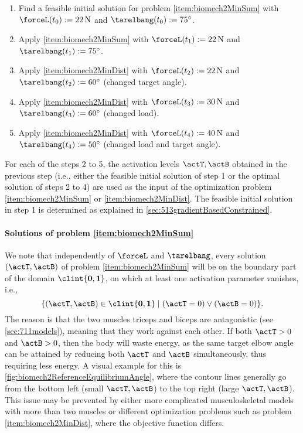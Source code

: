 \begin{enumerate}
  \item
  Find a feasible initial solution for problem \ref{item:biomech2MinSum}
  with $\forceL(t_0) := \SI{22}{\newton}$ and
  $\tarelbang(t_0) := \ang{75}$.
  
  \item
  Apply \ref{item:biomech2MinSum} with $\forceL(t_1) := \SI{22}{\newton}$ and
  $\tarelbang(t_1) := \ang{75}$.
  
  \item
  Apply \ref{item:biomech2MinDist} with $\forceL(t_2) := \SI{22}{\newton}$ and
  $\tarelbang(t_2) := \ang{60}$ (changed target angle).
  
  \item
  Apply \ref{item:biomech2MinDist} with $\forceL(t_3) := \SI{30}{\newton}$ and
  $\tarelbang(t_3) := \ang{60}$ (changed load).
  
  \item
  Apply \ref{item:biomech2MinDist} with $\forceL(t_4) := \SI{40}{\newton}$ and
  $\tarelbang(t_4) := \ang{50}$ (changed load and target angle).
\end{enumerate}
%
For each of the steps 2 to 5, the activation levels $\actT, \actB$ obtained
in the previous step (i.e., either the feasible initial solution
of step 1 or the optimal solution of steps 2 to 4) are used
as the input of the optimization problem
\ref{item:biomech2MinSum} or \ref{item:biomech2MinDist}.
The feasible initial solution in step 1 is determined as explained
in \cref{sec:513gradientBasedConstrained}.

\paragraph{Solutions of problem \ref{item:biomech2MinSum}}

We note that independently of $\forceL$ and $\tarelbang$,
every solution $(\actT, \actB)$ of problem \ref{item:biomech2MinSum} will be
on the boundary part of the domain $\clint{\*0, \*1}$,
on which at least one activation parameter vanishes, i.e.,
\begin{equation}
  \{(\actT, \actB) \in \clint{\*0, \*1} \mid
  (\actT = 0) \lor (\actB = 0)\}.
\end{equation}
The reason is that the two muscles triceps and biceps are antagonistic
(see \cref{sec:711models}), meaning that they work against each other.
If both $\actT > 0$ and $\actB > 0$, then the body will waste energy,
as the same target elbow angle can be attained by reducing both
$\actT$ and $\actB$ simultaneously, thus requiring less energy.
A visual example for this is \cref{fig:biomech2ReferenceEquilibriumAngle},
where the contour lines generally go from the bottom left
(small $\actT, \actB$) to the top right (large $\actT, \actB$).
This issue may be prevented by either
more complicated musculoskeletal models with more
than two muscles or different optimization problems
such as problem \ref{item:biomech2MinDist},
where the objective function differs.

